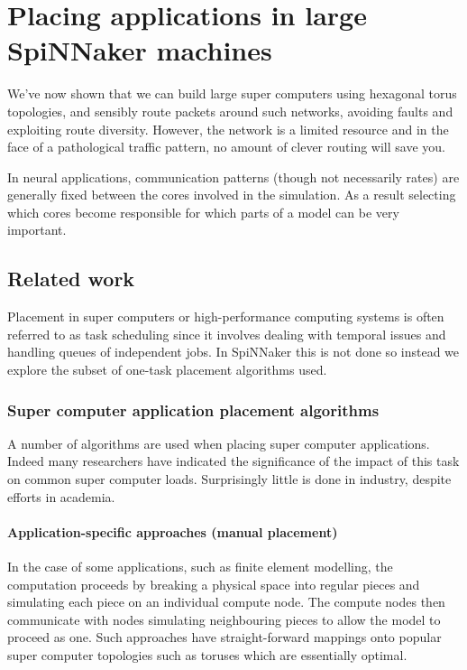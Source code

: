 \chapter{Placing applications in large SpiNNaker machines}

We've now shown that we can build large super computers using hexagonal torus
topologies, and sensibly route packets around such networks, avoiding faults
and exploiting route diversity. However, the network is a limited resource and
in the face of a pathological traffic pattern, no amount of clever routing will
save you.

In neural applications, communication patterns (though not necessarily rates)
are generally fixed between the cores involved in the simulation. As a result
selecting which cores become responsible for which parts of a model can be very
important.

	\section{Related work}
		
		Placement in super computers or high-performance computing systems is often
		referred to as task scheduling since it involves dealing with temporal
		issues and handling queues of independent jobs. In SpiNNaker this is not
		done so instead we explore the subset of one-task placement algorithms
		used.
		
		\subsection{Super computer application placement algorithms}
			
			A number of algorithms are used when placing super computer applications.
			Indeed many researchers have indicated the significance of the impact of
			this task on common super computer loads. Surprisingly little is done in
			industry, despite efforts in academia.
			
			\subsubsection{Application-specific approaches (manual placement)}
				
				In the case of some applications, such as finite element modelling, the
				computation proceeds by breaking a physical space into regular pieces
				and simulating each piece on an individual compute node. The compute
				nodes then communicate with nodes simulating neighbouring pieces to
				allow the model to proceed as one. Such approaches have
				straight-forward mappings onto popular super computer topologies such
				as toruses which are essentially optimal.
				
